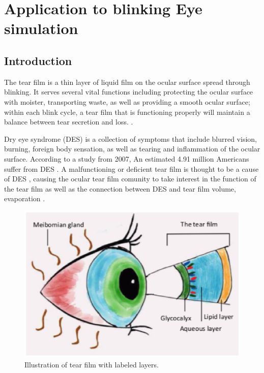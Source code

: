 \chapter{Application to blinking Eye simulation}

\section{Introduction}

The tear film is a thin layer of liquid film on the ocular surface spread through blinking. It serves several vital functions including protecting the ocular surface with moister, transporting waste, as well as providing a smooth ocular surface; within each blink cycle, a tear film that is functioning properly will maintain a balance between tear secretion and loss. \cite{holly1977tear}.

	Dry eye syndrome (DES) is a collection of symptoms that include blurred vision, burning, foreign body sensation, as well as tearing and inflammation of the ocular surface. According to a study from 2007, An estimated 4.91 million Americans suffer from DES \cite{bron2007methodologies}. A malfunctioning or deficient tear film is thought to be a cause of DES \cite{nelson2011international}, causing the ocular tear film comunity to take interest in the function of the tear film \cite{johnson2004changes} as well as the connection between DES and tear film volume, evaporation \cite{bron2007methodologies}.
	
\begin{figure}
  \centering
  \includegraphics[scale=0.6]{Chapter4/eye_model.eps}
  \caption{Illustration of tear film with labeled layers.}
  \label{eye_levels}
\end{figure}

